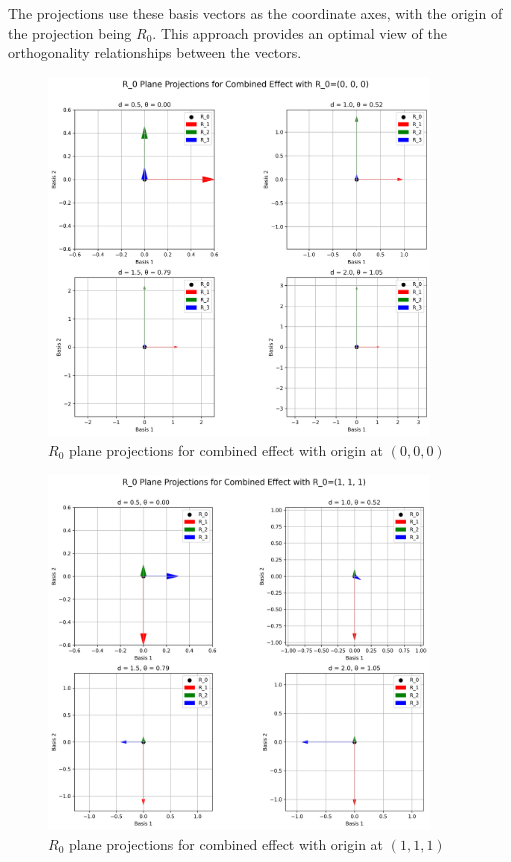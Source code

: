 The projections use these basis vectors as the coordinate axes, with the origin of the projection being $R_0$. This approach provides an optimal view of the orthogonality relationships between the vectors.

\begin{figure}[H]
    \centering
    \includegraphics[width=0.9\textwidth]{figures/r0_projections_combined_effect_R0_0_0_0.png}
    \caption{$R_0$ plane projections for combined effect with origin at $(0,0,0)$}
    \label{fig:example_r0_projections_default}
\end{figure}

\begin{figure}[H]
    \centering
    \includegraphics[width=0.9\textwidth]{figures/r0_projections_combined_effect_R0_1_1_1.png}
    \caption{$R_0$ plane projections for combined effect with origin at $(1,1,1)$}
    \label{fig:example_r0_projections_custom1}
\end{figure}

